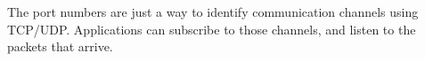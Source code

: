 The port numbers are just a way to identify communication channels using TCP/UDP. 
Applications can subscribe to those channels, and listen to the packets that arrive.
